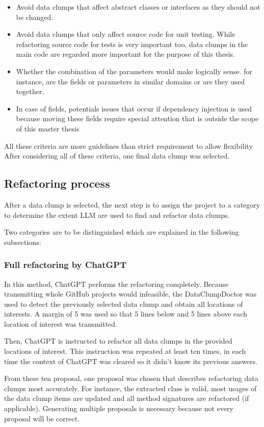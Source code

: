 \begin{itemize}
    \item Avoid data clumps that affect abstract classes or interfaces as they should not be changed.
    \item Avoid data clumps that only affect source code for unit testing. While refactoring source code for tests is very important too, data clumps in the main code are regarded more important for the purpose of this thesis.
    \item Whether the combination of the parameters would make logically sense. for instance, are the fields or parameters in similar domains or are they used together. 
    \item In case of fields, potentials issues that occur if dependency injection is used because moving these fields require special attention that is outside the scope of this master thesis
\end{itemize}
All these criteria are more guidelines than strict requirement to allow flexibility 
After considering all of these criteria, one final data clump was selected.
\subsection{Refactoring process}

After a data clump is selected, the next step is to assign the project to a category to determine the extent \acs{LLM} are used to find and refactor data clumps. 

Two categories are to be distinguished which are explained in the following subsections:

\subsubsection{Full refactoring by ChatGPT}
In this method, ChatGPT performs the refactoring completely. Because transmitting whole GitHub projects would infeasible, the DataClumpDoctor was used to detect the previously selected data clump and obtain all locations of interests. A margin of 5 was used so that 5 lines below and 5 lines above each location of interest was transmitted. 

Then, ChatGPT is instructed to refactor all data clumps in the provided locations of interest. This instruction was repeated at least ten times, in each time the context of ChatGPT was cleared so it didn't know its previous answers. 

From these ten proposal, one proposal was chosen that describes refactoring data clumps most accurately. For instance, the extracted class is valid, most usages of the data clump items are updated and all method signatures are refactored (if applicable). Generating multiple proposals is necessary because not every proposal will be correct.

